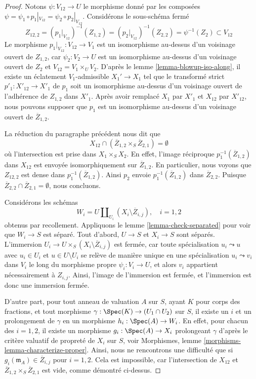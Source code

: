 \begin{proof}
\medskip\noindent
Notons $\psi : V_{12} \to U$ le morphisme donné par les composées
$\psi = \psi_1 \circ p_1|_{V_{12}} = \psi_2 \circ p_2|_{V_{12}}$.
Considérons le sous-schéma fermé
$$
Z_{12, 2} =
(p_1|_{V_{12}})^{-1}(Z_{1, 2}) =
(p_2|_{V_{12}})^{-1}(Z_{2, 2}) =
\psi^{-1}(Z_2) \subset V_{12}
$$
Le morphisme $p_1|_{V_{12}} : V_{12} \to V_1$ est un isomorphisme
au-dessus d'un voisinage ouvert de $Z_{1, 2}$, car $\psi_2 : V_2 \to U$
est un isomorphisme au-dessus d'un voisinage ouvert de $Z_2$ et
$V_{12} = V_1 \times_U V_2$.
D'après le lemme \ref{lemma-blowup-iso-along},
il existe un éclatement $V_1$-admissible $X_1' \to X_1$
tel que le transformé strict $p'_1 : X'_{12} \to X'_1$
de $p_1$ soit un isomorphisme au-dessus d'un voisinage ouvert de
l'adhérence de $Z_{1, 2}$ dans $X'_1$.
Après avoir remplacé $X_1$ par $X'_1$ et $X_{12}$ par $X'_{12}$,
nous pouvons supposer que $p_1$ est un isomorphisme au-dessus d'un voisinage
ouvert de $\overline{Z}_{1, 2}$.

\medskip\noindent
La réduction du paragraphe précédent nous dit que
$$
X_{12} \cap (\overline{Z}_{1, 2} \times_S \overline{Z}_{2, 1}) = \emptyset
$$
où l'intersection est prise dans $X_1 \times_S X_2$. En effet, l'image
réciproque $p_1^{-1}(\overline{Z}_{1, 2})$ dans $X_{12}$ est envoyée isomorphiquement
sur $\overline{Z}_{1, 2}$. En particulier, nous voyons que $Z_{12, 2}$
est dense dans $p_1^{-1}(\overline{Z}_{1, 2})$. Ainsi $p_2$ envoie
$p_1^{-1}(\overline{Z}_{1, 2})$ dans $\overline{Z}_{2, 2}$.
Puisque $\overline{Z}_{2, 2} \cap \overline{Z}_{2, 1} = \emptyset$,
nous concluons.

\medskip\noindent
Considérons les schémas
$$
W_i = U \coprod\nolimits_{U_i} (X_i \setminus \overline{Z}_{i, j}),
\quad i = 1, 2
$$
obtenus par recollement. Appliquons le lemme \ref{lemma-check-separated}
pour voir que $W_i \to S$ est séparé. Tout d'abord,
$U \to S$ et $X_i \to S$ sont séparés. L'immersion
$U_i \to U \times_S (X_i \setminus \overline{Z}_{i, j})$
est fermée, car toute spécialisation $u_i \leadsto u$
avec $u_i \in U_i$ et $u \in U \setminus U_i$
se relève de manière unique en une spécialisation
$u_i \leadsto v_i$ dans $V_i$ le long du morphisme propre
$\psi_i : V_i \to U$, et alors $v_i$ appartient nécessairement à $Z_{i, j}$.
Ainsi, l'image de l'immersion est fermée, et l'immersion
est donc une immersion fermée.

\medskip\noindent
D'autre part, pour tout anneau de valuation $A$ sur $S$, ayant $K$ pour corps des fractions,
et tout morphisme $\gamma : \Spec(K) \to (U_1 \cap U_2)$ sur $S$, il
existe un $i$ et un prolongement de $\gamma$ en un morphisme $h_i : \Spec(A) \to W_i$.
En effet, pour chacun des $i = 1, 2$, il existe un morphisme
$g_i : \Spec(A) \to X_i$ prolongeant $\gamma$ d'après le
critère valuatif de propreté de $X_i$ sur $S$, voir
Morphismes, lemme \ref{morphisms-lemma-characterize-proper}.
Ainsi, nous ne rencontrons une difficulté
que si $g_i(\mathfrak m_A) \in \overline{Z}_{i, j}$ pour $i = 1, 2$. Cela est
impossible, car l'intersection de $X_{12}$ et
$\overline{Z}_{1, 2} \times_S \overline{Z}_{2, 1}$ est vide, comme démontré ci-dessus.


\end{proof}
